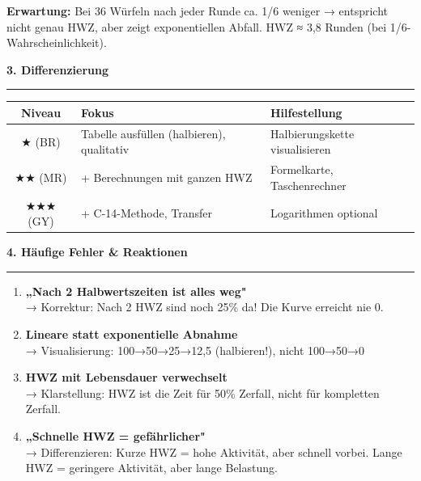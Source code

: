 \documentclass[11pt, a4paper]{article}
\newcommand{\abschnitt}[1]{%
    \vspace{10pt}\noindent\textbf{\textcolor{physik}{\large #1}}\vspace{6pt}\hrule\vspace{8pt}
}
\begin{document}
\textbf{Erwartung:} Bei 36 Würfeln nach jeder Runde ca. 1/6 weniger → entspricht nicht genau HWZ, aber zeigt exponentiellen Abfall. HWZ ≈ 3,8 Runden (bei 1/6-Wahrscheinlichkeit).

\vspace{12pt}

\abschnitt{3. Differenzierung}

\begin{tabularx}{\textwidth}{|c|X|X|}
\hline
\textbf{Niveau} & \textbf{Fokus} & \textbf{Hilfestellung} \\
\hline
★ (BR) & Tabelle ausfüllen (halbieren), qualitativ & Halbierungskette visualisieren \\
\hline
★★ (MR) & + Berechnungen mit ganzen HWZ & Formelkarte, Taschenrechner \\
\hline
★★★ (GY) & + C-14-Methode, Transfer & Logarithmen optional \\
\hline
\end{tabularx}

\vspace{12pt}

\abschnitt{4. Häufige Fehler \& Reaktionen}

\begin{warnbox}
\begin{enumerate}
\item \textbf{„Nach 2 Halbwertszeiten ist alles weg"}\\
→ Korrektur: Nach 2 HWZ sind noch 25\% da! Die Kurve erreicht nie 0.

\item \textbf{Lineare statt exponentielle Abnahme}\\
→ Visualisierung: 100→50→25→12,5 (halbieren!), nicht 100→50→0

\item \textbf{HWZ mit Lebensdauer verwechselt}\\
→ Klarstellung: HWZ ist die Zeit für 50\% Zerfall, nicht für kompletten Zerfall.

\item \textbf{„Schnelle HWZ = gefährlicher"}\\
→ Differenzieren: Kurze HWZ = hohe Aktivität, aber schnell vorbei. Lange HWZ = geringere Aktivität, aber lange Belastung.
\end{enumerate}
\end{warnbox}
\end{document}
